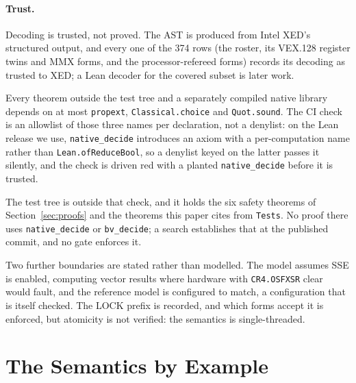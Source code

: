 \documentclass[runningheads]{llncs}
\newcommand{\src}[1]{}  %
\newcommand{\lean}[1]{\texttt{#1}}
\begin{document}
\paragraph{Trust.}
Decoding is trusted, not proved. The AST is produced from Intel XED's structured output, and every one
of the 374 rows (the roster, its VEX.128 register twins and MMX forms, and the processor-refereed forms) records its decoding as trusted to XED; a Lean decoder for the covered subset is later
work.
\src{TRUSTBASE.md, Decode trust; X86/Coverage.lean DecodeTrust; docs/CLAIMS.tsv[decode\_xed\_rows]}
Every theorem outside the test tree and a separately compiled native library depends on at most
\lean{propext}, \lean{Classical.choice} and \lean{Quot.sound}. The CI check is an allowlist of those
three names per declaration, not a denylist: on the Lean release we use, \lean{native\_decide}
introduces an axiom with a per-computation name rather than \lean{Lean.ofReduceBool}, so a denylist
keyed on the latter passes it silently, and the check is driven red with a planted
\lean{native\_decide} before it is trusted.
\src{TRUSTBASE.md, Axiom policy; scripts/axiom\_gate\_selftest.sh}
The test tree is outside that check, and it holds the six safety theorems of Section~\ref{sec:proofs} and
the theorems this paper cites from \lean{Tests}. No proof there uses \lean{native\_decide} or
\lean{bv\_decide}; a search establishes that at the published commit, and no gate enforces it.
\src{scripts/axiom\_gate.sh derives its modules from X86.lean's imports; Tests/Program.lean holds the six safety theorems;
git grep -n -E 'native\_decide|bv\_decide|ofReduceBool' -- 'Tests/*.lean' finds one line, a comment in Tests/Anchors.lean; docs/DECISIONS.md D248}
Two further boundaries are stated rather than modelled. The model assumes SSE is enabled, computing
vector results where hardware with \texttt{CR4.OSFXSR} clear would fault, and the reference model is
configured to match, a configuration that is itself checked. The LOCK prefix is recorded, and which
forms accept it is enforced, but atomicity is not verified: the semantics is single-threaded.
\src{TRUSTBASE.md, SSE availability and Atomicity; scripts/check\_driver\_cr4.py}

\section{The Semantics by Example}
\label{sec:examples}
\end{document}
